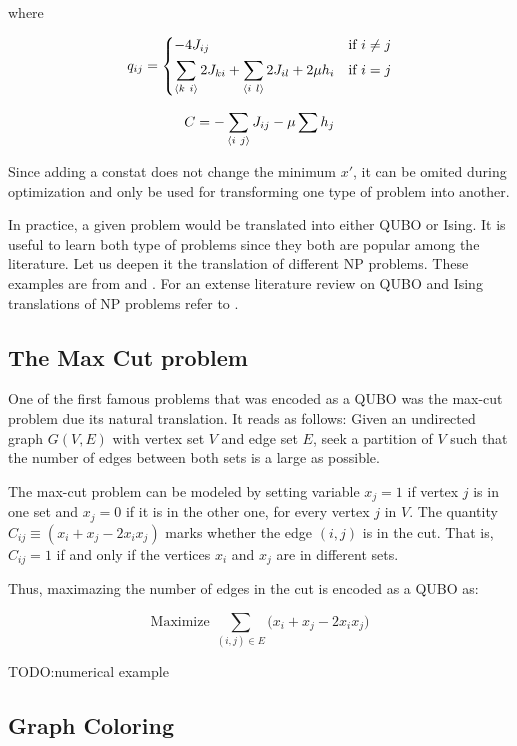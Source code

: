 where 

\begin{equation*}
	q_{ij} = 
		\begin{dcases}
			-4 J_{ij} 																	& \text{if } i \neq j \\
			\sum_{\langle k ~ i \rangle} 2 J_{ki} + \sum_{\langle i ~ l \rangle} 2 J_{il} + 2 \mu h_i	& \text{if } i = j
		\end{dcases}
\end{equation*}

$$ C = - \sum_{\langle i ~ j \rangle} J_{ij} - \mu \sum h_j $$

Since adding a constat does not change the minimum $x'$, it can be omited during optimization and only be used for transforming one type of problem into another.

In practice, a given problem would be translated into either QUBO or Ising. It is useful to learn both type of problems since they both are popular among the literature. Let us deepen it the translation of different NP problems. These examples are from \cite{Glover2019} and \cite{Lucas2014}. For an extense literature review on QUBO and Ising translations of NP problems refer to \cite{Kochenberger2014}.

\subsection{The Max Cut problem}

One of the first famous problems that was encoded as a QUBO was the max-cut problem due its natural translation. It reads as follows: Given an undirected graph $G(V, E)$ with vertex set $V$ and edge set $E$, seek a partition of $V$ such that the number of edges between both sets is a large as possible.

The max-cut problem can be modeled by setting variable $x_j = 1$ if vertex $j$ is in one set and $x_j = 0$ if it is in the other one, for every vertex $j$ in $V$. The quantity $C_{ij} \equiv (x_i + x_j - 2 x_i x_j)$ marks whether the edge $(i,j)$ is in the cut. That is, $C_{ij} = 1$ if and only if the vertices $x_i$ and $x_j$ are in different sets.

Thus, maximazing the number of edges in the cut is encoded as a QUBO as:

$$ \text{Maximize } \sum_{(i,j) \in E} \big( x_i + x_j - 2 x_i x_j \big) $$

TODO:numerical example


\subsection{Graph Coloring}
